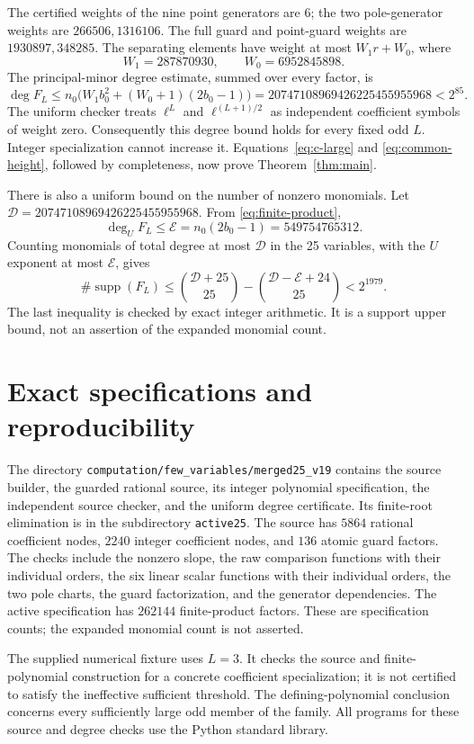 \documentclass[11pt,a4paper]{article}
\begin{document}
The certified weights of the nine point generators are $6$; the
two pole-generator weights are $266506,1316106$. The full
guard and point-guard weights are $1930897,348285$.
The separating elements have weight at most $W_1r+W_0$, where
\[
 W_1=287870930,\qquad W_0=6952845898.
\]
The principal-minor degree estimate, summed over every factor, is
\[
 \deg F_L\le n_0\bigl(W_1b_0^2+(W_0+1)(2b_0-1)\bigr)
       =20747108969426225455955968<2^{85}.
\]
The uniform checker treats $\ell^L$ and $\ell^{(L+1)/2}$ as
independent coefficient symbols of weight zero. Consequently this
degree bound holds for every fixed odd $L$. Integer specialization
cannot increase it. Equations~\eqref{eq:c-large} and
\eqref{eq:common-height}, followed by completeness, now prove
Theorem~\ref{thm:main}.

There is also a uniform bound on the number of nonzero monomials.
Let $\mathcal D=20747108969426225455955968$. From
\eqref{eq:finite-product},
\[
 \deg_U F_L\le\mathcal E=n_0(2b_0-1)=549754765312.
\]
Counting monomials of total degree at most $\mathcal D$ in the
25 variables, with the $U$ exponent at most $\mathcal E$, gives
\[
 \#\operatorname{supp}(F_L)
 \le\binom{\mathcal D+25}{25}
      -\binom{\mathcal D-\mathcal E+24}{25}<2^{1979}.
\]
The last inequality is checked by exact integer arithmetic. It is a
support upper bound, not an assertion of the expanded monomial count.

\section{Exact specifications and reproducibility}

The directory \nolinkurl{computation/few_variables/merged25_v19} contains
the source builder, the guarded rational source, its integer polynomial
specification, the independent source checker, and the uniform degree
certificate. Its finite-root elimination is in the subdirectory
\nolinkurl{active25}. The source has $5864$ rational
coefficient nodes, $2240$ integer coefficient nodes, and $136$
atomic guard factors. The checks include the nonzero slope, the raw comparison functions with their individual orders,
the six linear scalar functions with their individual orders, the two pole charts,
the guard factorization, and the generator dependencies. The active
specification has $262144$ finite-product factors. These are
specification counts; the expanded monomial count is not asserted.

The supplied numerical fixture uses $L=3$. It checks the source
and finite-polynomial construction for a concrete coefficient
specialization; it is not certified to satisfy the ineffective
sufficient threshold. The defining-polynomial conclusion concerns
every sufficiently large odd member of the family. All programs
for these source and degree checks use the Python standard library.
\end{document}
